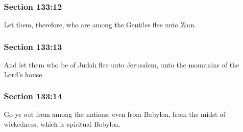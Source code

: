	\subsubsection{Section 133:12} %
		\label{DC133-12}

		Let them, therefore, who are among the Gentiles flee unto Zion.


	\subsubsection{Section 133:13} %
		\label{DC133-13}

		And let them who be of Judah flee unto Jerusalem, unto the mountains of the Lord's house.


	\subsubsection{Section 133:14} %
		\label{DC133-14}

		Go ye out from among the nations, even from Babylon, from the midst of wickedness, which is spiritual Babylon.


